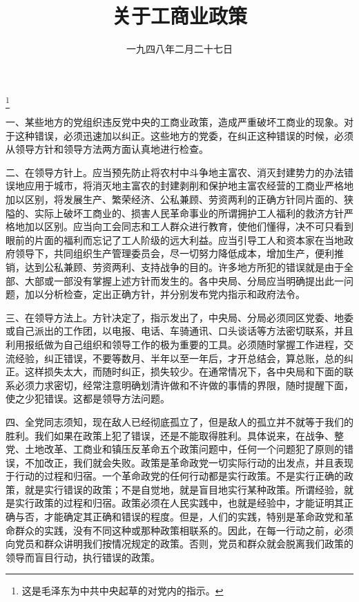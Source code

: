 
\title{关于工商业政策}
\date{一九四八年二月二十七日}
\thanks{这是毛泽东为中共中央起草的对党内的指示。}
\maketitle


一、某些地方的党组织违反党中央的工商业政策，造成严重破坏工商业的现象。对于这种错误，必须迅速加以纠正。这些地方的党委，在纠正这种错误的时候，必须从领导方针和领导方法两方面认真地进行检查。

二、在领导方针上。应当预先防止将农村中斗争地主富农、消灭封建势力的办法错误地应用于城市，将消灭地主富农的封建剥削和保护地主富农经营的工商业严格地加以区别，将发展生产、繁荣经济、公私兼顾、劳资两利的正确方针同片面的、狭隘的、实际上破坏工商业的、损害人民革命事业的所谓拥护工人福利的救济方针严格地加以区别。应当向工会同志和工人群众进行教育，使他们懂得，决不可只看到眼前的片面的福利而忘记了工人阶级的远大利益。应当引导工人和资本家在当地政府领导下，共同组织生产管理委员会，尽一切努力降低成本，增加生产，便利推销，达到公私兼顾、劳资两利、支持战争的目的。许多地方所犯的错误就是由于全部、大部或一部没有掌握上述方针而发生的。各中央局、分局应当明确提出此一问题，加以分析检查，定出正确方针，并分别发布党内指示和政府法令。

三、在领导方法上。方针决定了，指示发出了，中央局、分局必须同区党委、地委或自己派出的工作团，以电报、电话、车骑通讯、口头谈话等方法密切联系，并且利用报纸做为自己组织和领导工作的极为重要的工具。必须随时掌握工作进程，交流经验，纠正错误，不要等数月、半年以至一年后，才开总结会，算总账，总的纠正。这样损失太大，而随时纠正，损失较少。在通常情况下，各中央局和下面的联系必须力求密切，经常注意明确划清许做和不许做的事情的界限，随时提醒下面，使之少犯错误。这都是领导方法问题。

四、全党同志须知，现在敌人已经彻底孤立了，但是敌人的孤立并不就等于我们的胜利。我们如果在政策上犯了错误，还是不能取得胜利。具体说来，在战争、整党、土地改革、工商业和镇压反革命五个政策问题中，任何一个问题犯了原则的错误，不加改正，我们就会失败。政策是革命政党一切实际行动的出发点，并且表现于行动的过程和归宿。一个革命政党的任何行动都是实行政策。不是实行正确的政策，就是实行错误的政策；不是自觉地，就是盲目地实行某种政策。所谓经验，就是实行政策的过程和归宿。政策必须在人民实践中，也就是经验中，才能证明其正确与否，才能确定其正确和错误的程度。但是，人们的实践，特别是革命政党和革命群众的实践，没有不同这种或那种政策相联系的。因此，在每一行动之前，必须向党员和群众讲明我们按情况规定的政策。否则，党员和群众就会脱离我们政策的领导而盲目行动，执行错误的政策。
